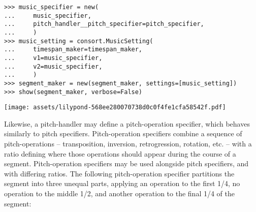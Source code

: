 \begin{abjadbookoutput}
\begin{singlespacing}
\vspace{-0.5\baselineskip}
\begin{verbatim}
>>> music_specifier = new(
...     music_specifier,
...     pitch_handler__pitch_specifier=pitch_specifier,
...     )
>>> music_setting = consort.MusicSetting(
...     timespan_maker=timespan_maker,
...     v1=music_specifier,
...     v2=music_specifier,
...     )
>>> segment_maker = new(segment_maker, settings=[music_setting])
>>> show(segment_maker, verbose=False)
\end{verbatim}
\noindent\texttt{[image: assets/lilypond-568ee280070738d0c0f4fe1cfa58542f.pdf]}
\end{singlespacing}
\end{abjadbookoutput}

\noindent Likewise, a pitch-handler may define a pitch-operation specifier,
which behaves similarly to pitch specifiers. Pitch-operation specifiers combine
a sequence of pitch-operations -- transposition, inversion, retrogression,
rotation, etc. -- with a ratio defining where those operations should appear
during the course of a segment. Pitch-operation specifiers may be used
alongside pitch specifiers, and with differing ratios. The following
pitch-operation specifier partitions the segment into three unequal parts,
applying an operation to the first 1/4, no operation to the middle 1/2, and
another operation to the final 1/4 of the segment:

\begin{comment}
<abjad>[stylesheet=../consort.ily]
music_specifier = new(
    music_specifier,
    pitch_handler__pitch_operation_specifier=consort.PitchOperationSpecifier(
        pitch_operations=(
            pitchtools.PitchOperation((
                pitchtools.Inversion(),
                )),
            None,
            pitchtools.PitchOperation((
                pitchtools.Rotation(-1),
                pitchtools.Transposition(-1),
                ))
            ),
        ratio=(1, 2, 1),
        ),
    )
music_setting = consort.MusicSetting(
    timespan_maker=timespan_maker,
    v1=music_specifier,
    v2=music_specifier,
    )
segment_maker = new(segment_maker, settings=[music_setting])
show(segment_maker, verbose=False)
</abjad>
\end{comment}


